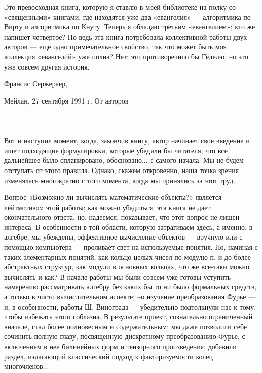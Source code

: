 \documentclass{mai_book}
\begin{document}
{{   Это превосходная книга, которую я ставлю в моей библиотеке на полку со «священными» книгами, где находятся уже два «евангелия» — алгоритмика по Вирту и алгоритмика по Кнуту. Теперь я обладаю третьим «евангелием»; кто же напишет четвертое? Но ведь эта книга потребовала коллективной работы двух авторов — еще одно примечательное свойство, так что может быть моя коллекция «евангелий» уже полна? Нет: это противоречило бы Гёделю, но это уже совсем другая история.
   
\hspace{3.6in} Франсис Сержераер,

\hspace{3.1in} Мейлан, 27 сентября 1991 г.
\newpage
\hspace{1.5in} {\huge От авторов}
\\\\\\\\
   Вот и наступил момент, когда, закончив книгу, автор начинает свое введение и ищет подходящие формулировки, которые убедили бы читателя, что все дальнейшее было спланировано, обосновано... с самого начала. Мы не будем отступать от этого правила. Однако, скажем откровенно, наша точка зрения изменялась многократно с того момента, когда мы принялись за этот труд.

   Вопрос «Возможно ли вычислять математические объекты?» является лейтмотивом этой работы; как можно убедиться, эта книга не дает окончательного ответа, но, надеемся, показывает, что этот вопрос не лишен интереса. В особенности в той области, которую затрагиваем здесь, а именно, в алгебре, мы убеждены, эффективное вычисление объектов — вручную или с помощью компьютера — проливает свет на используемые понятия. Но, начиная с таких элементарных понятий, как кольцо целых чисел по модулю п, и до более абстрактных структур, как модули в основных кольцах, что же все-таки можно вычислять и как? В начале работы мы были совсем уже готовы уступить намерению рассматривать алгебру без каких бы то ни было формальных средств, а только в чисто вычислительном аспекте; но изучение преобразования Фурье — и, в особенности, работы Ш. Винограда — убедительно подтолкнули нас к тому, чтобы избежать этого соблазна. В результате проект, сознательно ограниченный вначале, стал более полновесным и содержательным; мы даже позволили себе сочинить полную главу, посвященную дискретному преобразованию Фурье, с включением в нее билинейных форм и тензорного произведения; добавили раздел, излагающий классический подход к факторизуемости колец многочленов...

}}
\end{document}
